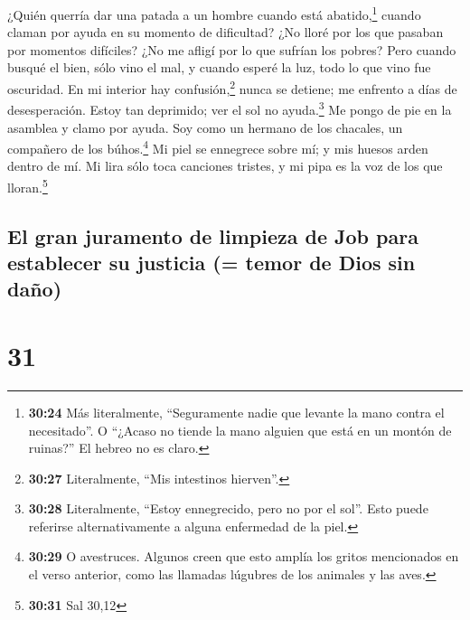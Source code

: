  ¿Quién querría dar una patada a un hombre cuando está
abatido,\footnote{\textbf{30:24} Más literalmente, ``Seguramente nadie
  que levante la mano contra el necesitado''. O ``¿Acaso no tiende la
  mano alguien que está en un montón de ruinas?'' El hebreo no es claro.}
cuando claman por ayuda en su momento de dificultad?  ¿No
lloré por los que pasaban por momentos difíciles? ¿No me afligí por lo
que sufrían los pobres?  Pero cuando busqué el bien, sólo
vino el mal, y cuando esperé la luz, todo lo que vino fue oscuridad.
 En mi interior hay confusión,\footnote{\textbf{30:27}
  Literalmente, ``Mis intestinos hierven''.} nunca se detiene; me
enfrento a días de desesperación.  Estoy tan deprimido;
ver el sol no ayuda.\footnote{\textbf{30:28} Literalmente, ``Estoy
  ennegrecido, pero no por el sol''. Esto puede referirse
  alternativamente a alguna enfermedad de la piel.} Me pongo de pie en
la asamblea y clamo por ayuda.  Soy como un hermano de
los chacales, un compañero de los búhos.\footnote{\textbf{30:29} O
  avestruces. Algunos creen que esto amplía los gritos mencionados en el
  verso anterior, como las llamadas lúgubres de los animales y las aves.}
 Mi piel se ennegrece sobre mí; y mis huesos arden dentro
de mí.  Mi lira sólo toca canciones tristes, y mi pipa es
la voz de los que lloran.\footnote{\textbf{30:31} Sal 30,12}

\hypertarget{el-gran-juramento-de-limpieza-de-job-para-establecer-su-justicia-temor-de-dios-sin-dauxf1o}{%
\subsection{El gran juramento de limpieza de Job para establecer su
justicia (= temor de Dios sin
daño)}\label{el-gran-juramento-de-limpieza-de-job-para-establecer-su-justicia-temor-de-dios-sin-dauxf1o}}

\hypertarget{section-30}{%
\section{31}\label{section-30}}

